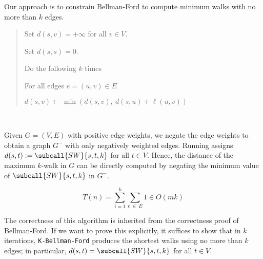\documentclass{article}
\begin{document}
\begin{solution}
Our approach is to constrain Bellman-Ford to compute minimum walks with no more than \( k \) edges.

\begin{quote}%


\begin{steps}
  \item Set \( d(s, v) = +\infty \) for all \( v \in V \).
  \item Set \( d(s,s) = 0. \)
  \item Do the following \( k \) times
  \begin{steps}
      \item For all edges \( e=(u,v) \in E \)
      \begin{steps}
          \item \( d(s,v) \leftarrow \min (d(s,v), \ d(s,u) + \ell(u,v)) \)
      \end{steps}
  \end{steps}
\end{steps}
\end{quote}

\

Given \( G = (V, E) \) with positive edge weights, we negate the edge weights to obtain a graph \( G^{-} \) with only negatively weighted edges.
Running  assigns \( d (s,t) := \subcall{SW}{s,t,k} \) for all \( t \in V \).
Hence, the distance of the maximum \( k \)-walk in \( G \) can be directly computed by negating the minimum value of \( \subcall{SW}{s, t, k} \) in \( G^{-} \).

\begin{subproof}[Runtime.]
\[T(n) = \sum_{i=1}^{k} \sum_{e \ \in \ E} 1 \in O(mk)\]
\end{subproof}

\begin{subproof}[Correctness.]
The correctness of this algorithm is inherited from the correctness proof of Bellman-Ford. If we want to prove this explicitly, it suffices to show that in \( k \) iterations, \texttt{K-Bellman-Ford} produces the shortest walks using no more than \( k \) edges; in particular, \( d(s,t) = \subcall{SW}{s,t,k} \) for all \( t \in V \).


\end{subproof}
\end{solution}
\end{document}
